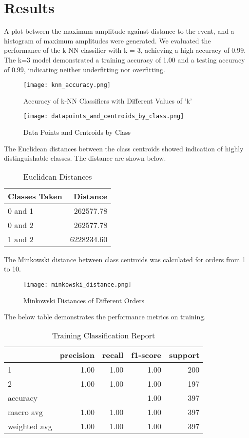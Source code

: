 \documentclass[conference]{IEEEtran}
\begin{document}
\section{Results}
\label{sec:orga8e12bd}
A plot between the maximum amplitude against distance to the event, and a
histogram of maximum amplitudes were generated. We evaluated the
performance of the k-NN classifier with k = 3, achieving a high accuracy of
0.99. The k=3 model demonstrated a training accuracy of 1.00 and a testing
accuracy of 0.99, indicating neither underfitting nor overfitting.

\begin{figure}[htbp]
    \centering
    \texttt{[image: knn\_accuracy.png]}
    \caption{Accuracy of k-NN Classifiers with Different Values of 'k'}
    \label{fig:example}
\end{figure}


\begin{figure}[htbp]
    \centering
    \texttt{[image: datapoints\_and\_centroids\_by\_class.png]}
    \caption{Data Points and Centroids by Class}
    \label{fig:example}
\end{figure}

The Euclidean distances between the class centroids showed indication of highly
distinguishable classes. The distance are shown below.

\begin{table}[htbp]
\caption{Euclidean Distances}
\centering
\begin{tabular}{lr}
Classes Taken & Distance\\
\hline
0 and 1 & 262577.78\\
0 and 2 & 262577.78\\
1 and 2 & 6228234.60\\
\end{tabular}
\end{table}


The Minkowski distance between class centroids was calculated for orders from 1
to 10.

\begin{figure}[htbp]
    \centering
    \texttt{[image: minkowski\_distance.png]}
    \caption{Minkowski Distances of Different Orders}
    \label{fig:example}
\end{figure}

The below table demonstrates the performance metrics on training.

\begin{table}[htbp]
\caption{Training Classification Report}
\centering
\begin{tabular}{lrrrr}
 & precision & recall & f1-score & support\\
\hline
1 & 1.00 & 1.00 & 1.00 & 200\\
2 & 1.00 & 1.00 & 1.00 & 197\\
accuracy &  &  & 1.00 & 397\\
macro avg & 1.00 & 1.00 & 1.00 & 397\\
weighted avg & 1.00 & 1.00 & 1.00 & 397\\
\end{tabular}
\end{table}
\end{document}
